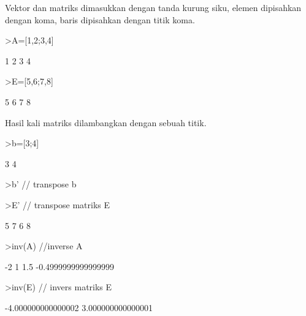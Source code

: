 \documentclass[a4paper,10pt]{article}
\begin{document}
\begin{eulernotebook}
\begin{eulercomment}
\begin{eulercomment}
\begin{eulercomment}
\begin{eulercomment}
\begin{eulercomment}
Vektor dan matriks dimasukkan dengan tanda kurung siku, elemen
dipisahkan dengan koma, baris dipisahkan dengan titik koma.
\end{eulercomment}
\begin{eulerprompt}
>A=[1,2;3,4]
\end{eulerprompt}
\begin{euleroutput}
                        1                       2 
                        3                       4 
\end{euleroutput}
\begin{eulerprompt}
>E=[5,6;7,8]
\end{eulerprompt}
\begin{euleroutput}
                        5                       6 
                        7                       8 
\end{euleroutput}
\begin{eulercomment}
Hasil kali matriks dilambangkan dengan sebuah titik.
\end{eulercomment}
\begin{eulerprompt}
>b=[3;4]
\end{eulerprompt}
\begin{euleroutput}
                        3 
                        4 
\end{euleroutput}
\begin{eulerprompt}
>b' // transpose b
\end{eulerprompt}
\begin{euleroutput}
  [3,  4]
\end{euleroutput}
\begin{eulerprompt}
>E' // transpose matriks E
\end{eulerprompt}
\begin{euleroutput}
                        5                       7 
                        6                       8 
\end{euleroutput}
\begin{eulerprompt}
>inv(A) //inverse A
\end{eulerprompt}
\begin{euleroutput}
                       -2                       1 
                      1.5     -0.4999999999999999 
\end{euleroutput}
\begin{eulerprompt}
>inv(E) // invers matriks E
\end{eulerprompt}
\begin{euleroutput}
       -4.000000000000002       3.000000000000001 

\end{euleroutput}
\end{eulercomment}
\end{eulercomment}
\end{eulercomment}
\end{eulercomment}
\end{eulernotebook}
\end{document}

